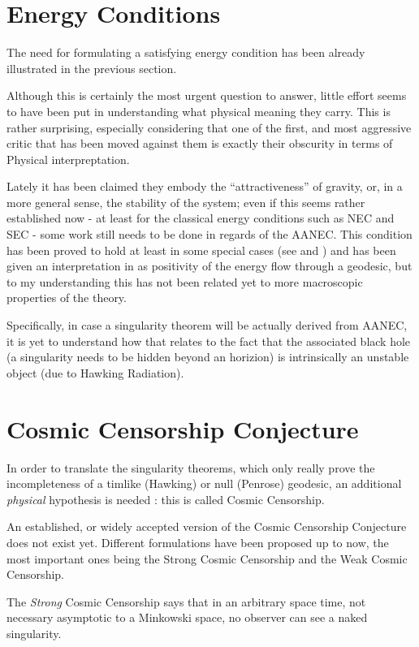 \documentclass[12pt, a4paper]{article}
\begin{document}
\section{Energy Conditions}

The need for formulating a satisfying energy condition has been already illustrated in the previous section.

Although this is certainly the most urgent question to answer, little effort seems to have been put in understanding what physical meaning they carry. This is rather surprising, especially considering that one of the first, and most aggressive critic that has been moved against them is exactly their obscurity in terms of Physical interpreptation.

Lately it has been claimed they embody the ``attractiveness''  of gravity, or, in a more general sense, the stability of the system; even if this seems rather established now - at least for the classical energy conditions such as NEC and SEC - some work still needs to be done in regards of the AANEC. 
This condition has been proved to hold at least in some special cases (see \cite{wall2010proving} and \cite{verch2000averaged}) and has been given an interpretation in \cite{curiel2017primer} as positivity of the energy flow through a geodesic, but to my understanding this has not been related yet to more macroscopic properties of the theory.

Specifically, in case a singularity theorem will be actually derived from AANEC, it is yet to understand how that relates to the fact that the associated black hole (a singularity needs to be hidden beyond an horizion) is intrinsically an unstable object (due to Hawking Radiation).

\section{Cosmic Censorship Conjecture}

In order to translate the singularity theorems, which only really prove the incompleteness of a timlike (Hawking) or null (Penrose) geodesic, an additional \emph{physical} hypothesis is needed \cite{witten2020light}: this is called Cosmic Censorship.

An established, or widely accepted version of the Cosmic Censorship Conjecture does not exist yet. Different formulations have been proposed up to now, the most important ones being the Strong Cosmic Censorship and the Weak Cosmic Censorship.

The \emph{Strong} Cosmic Censorship says that in an arbitrary space time, not necessary asymptotic to a Minkowski space, no observer can see a naked singularity.
\end{document}
